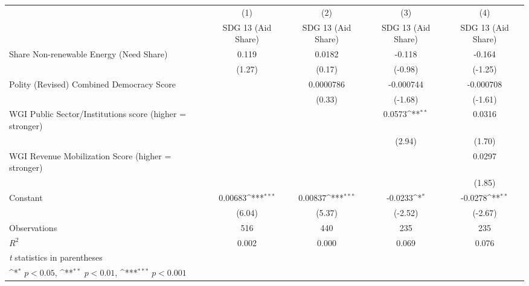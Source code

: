 {
\def\sym#1{\ifmmode^{#1}\else\(^{#1}\)\fi}
\begin{tabular}{l*{4}{c}}
\hline\hline
                &\multicolumn{1}{c}{(1)}&\multicolumn{1}{c}{(2)}&\multicolumn{1}{c}{(3)}&\multicolumn{1}{c}{(4)}\\
                &\multicolumn{1}{c}{SDG 13 (Aid Share)}&\multicolumn{1}{c}{SDG 13 (Aid Share)}&\multicolumn{1}{c}{SDG 13 (Aid Share)}&\multicolumn{1}{c}{SDG 13 (Aid Share)}\\
\hline
Share Non-renewable Energy (Need Share)&    0.119         &   0.0182         &   -0.118         &   -0.164         \\
                &   (1.27)         &   (0.17)         &  (-0.98)         &  (-1.25)         \\
[1em]
Polity (Revised) Combined Democracy Score&                  &0.0000786         &-0.000744         &-0.000708         \\
                &                  &   (0.33)         &  (-1.68)         &  (-1.61)         \\
[1em]
WGI Public Sector/Institutions score (higher = stronger)&                  &                  &   0.0573\sym{**} &   0.0316         \\
                &                  &                  &   (2.94)         &   (1.70)         \\
[1em]
WGI Revenue Mobilization Score (higher = stronger)&                  &                  &                  &   0.0297         \\
                &                  &                  &                  &   (1.85)         \\
[1em]
Constant        &  0.00683\sym{***}&  0.00837\sym{***}&  -0.0233\sym{*}  &  -0.0278\sym{**} \\
                &   (6.04)         &   (5.37)         &  (-2.52)         &  (-2.67)         \\
\hline
Observations    &      516         &      440         &      235         &      235         \\
\(R^{2}\)       &    0.002         &    0.000         &    0.069         &    0.076         \\
\hline\hline
\multicolumn{5}{l}{\footnotesize \textit{t} statistics in parentheses}\\
\multicolumn{5}{l}{\footnotesize \sym{*} \(p<0.05\), \sym{**} \(p<0.01\), \sym{***} \(p<0.001\)}\\
\end{tabular}
}
